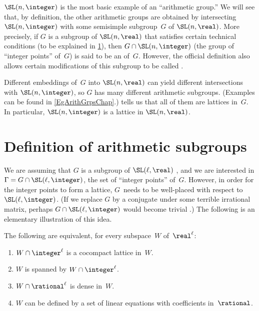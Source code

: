 
\label{ArithGrpsChap}


$\SL(n,\integer)$ is the most basic example of an ``arithmetic group\zz.'' We will see that, by definition, the other arithmetic groups are obtained by intersecting $\SL(n,\integer)$ with some semisimple subgroup~$G$ of $\SL(n,\real)$. More precisely, if $G$ is a subgroup of $\SL(n,\real)$ that satisfies certain technical conditions (to be explained in \cref{ArithLattDefnSect}), then $G \cap \SL(n,\integer)$ (the group of ``integer points'' of~$G$) is said to be an  of~$G$. However, the official definition  also allows certain modifications of this subgroup to be called .

Different embeddings of~$G$ into $\SL(n,\real)$ can yield different intersections with $\SL(n,\integer)$, so $G$ has many different arithmetic subgroups. 
(Examples can be found in \cref{EgArithGrpsChap}.) 
 tells us that all of them are lattices in~$G$. In particular, $\SL(n,\integer)$ is a lattice in $\SL(n,\real)$.




\section{Definition of arithmetic subgroups} \label{ArithLattDefnSect}

We are assuming that $G$ is a subgroup of $\SL(\ell,\real)$ , and we are interested in $\Gamma = G \cap \SL(\ell,\integer)$, the set of 
``integer points'' of~$G$. However, in order for the integer
points to form a lattice, $G$~needs to be well-placed with
respect to $\SL(\ell,\integer)$. (If we replace $G$ by a
conjugate under some terrible irrational matrix, perhaps $G
\cap \SL(\ell,\integer)$ would become trivial
.) The following  is an elementary
illustration of this idea.

\begin{prop} \label{RnDefdQ<>Latt}
 The following are
equivalent, for every subspace~$W$ of\/~$\real^\ell$:
 \begin{enumerate}
 \item \label{RnDefdQ<>Latt-latt}
 $W \cap \integer^\ell$ is a cocompact lattice in~$W$.
 \item \label{RnDefdQ<>Latt-span}
 $W$ is spanned by $W \cap \integer^\ell$.
 \item \label{RnDefdQ<>Latt-dense}
 $W \cap \rational^\ell$ is dense in~$W$.
 \item \label{RnDefdQ<>Latt-eqs}
 $W$ can be defined by a set of linear equations with coefficients in~$\rational$.
\end{enumerate}
 \end{prop}

